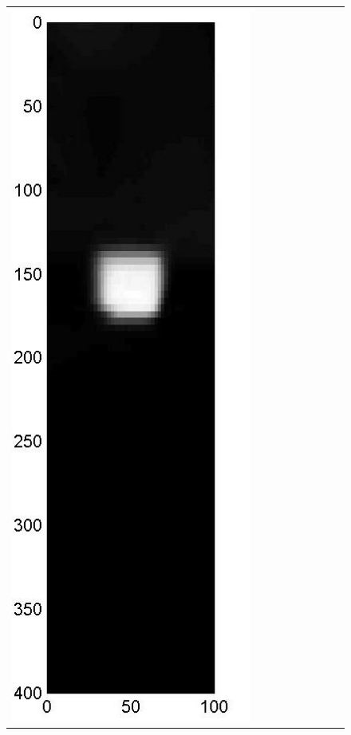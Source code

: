 \documentclass[english]{siamltex}
\begin{document}
{\begin{figure}[!h]
\begin{center}
\begin{tabular}{|c|c|c|c|c|c|c|c|c|}
			\includegraphics[width=.9\iwidth]{figures/newFigs/noisy/resultsExp-3-mkTV}
			&

\end{tabular}
\end{center}
\end{figure}}
\end{document}
